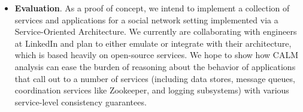 \begin{itemize}
\item \textbf{Evaluation}.  As a proof of concept, we intend to implement a collection of services and applications for a social network setting implemented via a Service-Oriented Architecture.  We currently are collaborating with engineers at LinkedIn and plan to either emulate or integrate with their architecture, which is based heavily on open-source services.
We hope to show how CALM analysis can ease the burden of reasoning about the behavior of applications
that call out to a number of services (including data stores, message queues, coordination services like Zookeeper, 
and logging subsystems)
with various service-level consistency guarantees.

\end{itemize}

